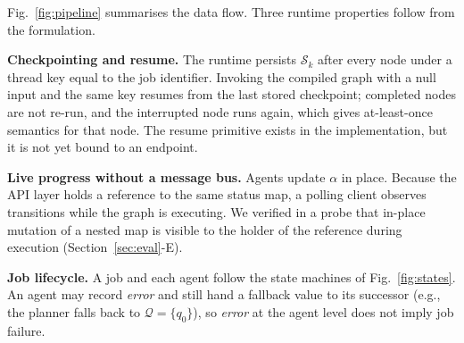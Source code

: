 \documentclass[conference]{IEEEtran}
\newcommand{\cQ}{\mathcal{Q}}
\newcommand{\cS}{\mathcal{S}}
\begin{document}
Fig.~\ref{fig:pipeline} summarises the data flow. Three runtime properties follow from the formulation.

\textbf{Checkpointing and resume.} The runtime persists $\cS_k$ after every node under a thread key equal to the job identifier. Invoking the compiled graph with a null input and the same key resumes from the last stored checkpoint; completed nodes are not re-run, and the interrupted node runs again, which gives at-least-once semantics for that node. The resume primitive exists in the implementation, but it is not yet bound to an endpoint.

\textbf{Live progress without a message bus.} Agents update $\alpha$ in place. Because the API layer holds a reference to the same status map, a polling client observes transitions while the graph is executing. We verified in a probe that in-place mutation of a nested map is visible to the holder of the reference during execution (Section~\ref{sec:eval}-E).

\textbf{Job lifecycle.} A job and each agent follow the state machines of Fig.~\ref{fig:states}. An agent may record \textit{error} and still hand a fallback value to its successor (e.g., the planner falls back to $\cQ=\{q_0\}$), so \textit{error} at the agent level does not imply job failure.
\end{document}
